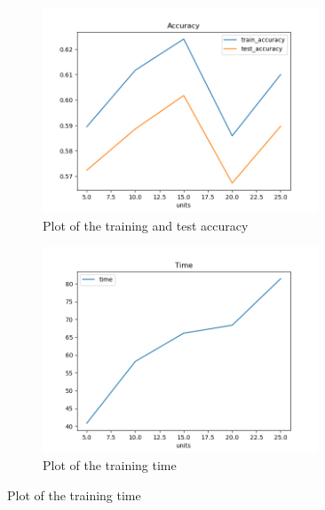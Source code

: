 \documentclass[11pt]{article}
\begin{document}
\begin{figure}[H]
  \begin{subfigure}{0.5\textwidth}
    \centering
    \includegraphics[width=0.9\textwidth]{Q2/output/d_accuracy.png}
    \caption{Plot of the training and test accuracy}
  \end{subfigure}
  \begin{subfigure}{0.5\textwidth}
    \centering
    \includegraphics[width=0.9\textwidth]{Q2/output/d_time.png}
    \caption{Plot of the training time}
  \end{subfigure}
\end{figure}
\end{document}

